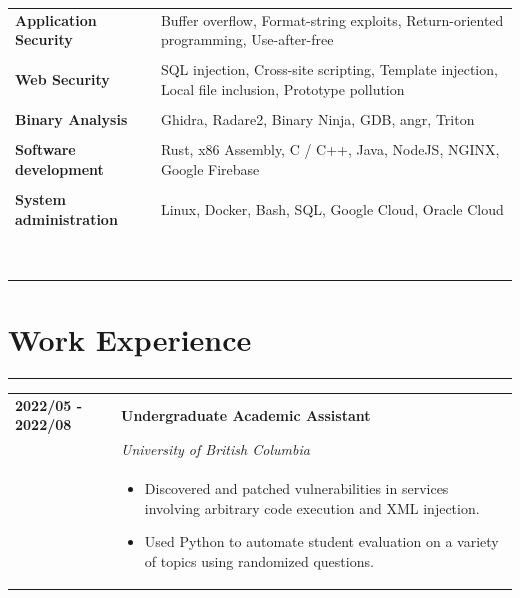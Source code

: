\documentclass[letterpaper]{article}
\newcommand{\sectcolor}{cyan}
\newcommand{\sect}[1]{\section*{#1}
                        {\color{\sectcolor}
                        \rule{\textwidth}{1pt}
                        \vspace{-4pt}}}
\begin{document}
        \begin{tabular}{>{\raggedleft\arraybackslash}p{}
                        p{}}
            \textbf{Application Security} &
                Buffer overflow,
                Format-string exploits,
                Return-oriented programming,
                Use-after-free
                \\\\
            \textbf{Web Security} &
                SQL injection,
                Cross-site scripting,
                Template injection,
                Local file inclusion,
                Prototype pollution
                \\\\
            \textbf{Binary Analysis} &
                Ghidra,
                Radare2,
                Binary Ninja,
                GDB,
                angr,
                Triton
                \\\\
            \textbf{Software development} &
                Rust,
                x86 Assembly,
                C / C++,
                Java,
                NodeJS,
                NGINX,
                Google Firebase
                \\\\
            \textbf{System administration} &
                Linux,
                Docker,
                Bash,
                SQL,
                Google Cloud,
                Oracle Cloud
                \\\\

                \\\\\\\\\\\\\\\\
        \end{tabular}

    \sect{Work Experience}

        \begin{tabular}{p{} p{}}
            \textbf{2022/05 - 2022/08} & \textbf{Undergraduate Academic Assistant} \\
            & \emph{University of British Columbia} \\
            & \begin{itemize}
                \item Discovered and patched vulnerabilities in services involving arbitrary code
                    execution and XML injection.
                \item Used Python to automate student evaluation on a variety of topics using randomized
                    questions.
            \end{itemize}
        \end{tabular}
\end{document}
